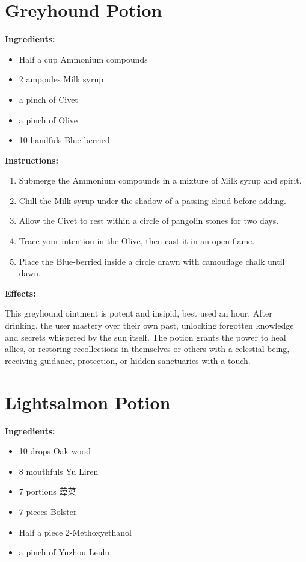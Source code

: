 \documentclass{article}
\begin{document}
\newpage
\section*{Greyhound Potion}

\textbf{Ingredients:}

\begin{itemize}
  \item Half a cup Ammonium compounds
  \item 2 ampoules Milk syrup
  \item a pinch of Civet
  \item a pinch of Olive
  \item 10 handfuls Blue-berried
\end{itemize}

\textbf{Instructions:}

\begin{enumerate}
  \item Submerge the Ammonium compounds in a mixture of Milk syrup and spirit.
  \item Chill the Milk syrup under the shadow of a passing cloud before adding.
  \item Allow the Civet to rest within a circle of pangolin stones for two days.
  \item Trace your intention in the Olive, then cast it in an open flame.
  \item Place the Blue-berried inside a circle drawn with camouflage chalk until dawn.
\end{enumerate}

\textbf{Effects:}

This greyhound ointment is potent and insipid, best used an hour. After drinking, the user mastery over their own past, unlocking forgotten knowledge and secrets whispered by the sun itself. The potion grants the power to heal allies, or restoring recollections in themselves or others with a celestial being, receiving guidance, protection, or hidden sanctuaries with a touch.

\newpage
\section*{Lightsalmon Potion}

\textbf{Ingredients:}

\begin{itemize}
  \item 10 drops Oak wood
  \item 8 mouthfuls Yu Liren
  \item 7 portions 蔊菜
  \item 7 pieces Bolster
  \item Half a piece 2-Methoxyethanol
  \item a pinch of Yuzhou Leulu
\end{itemize}
\end{document}
